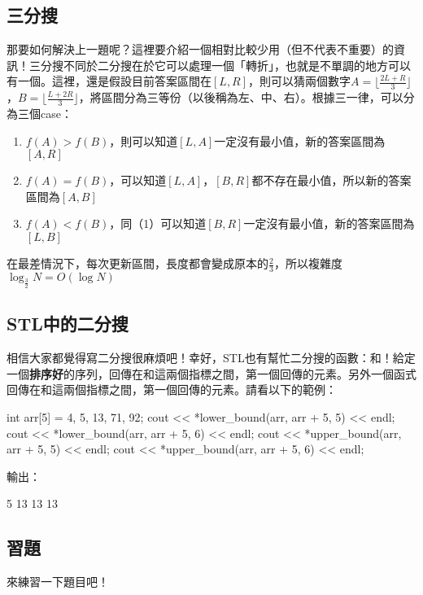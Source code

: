 	\subsection{三分搜}
		那要如何解決上一題呢？這裡要介紹一個相對比較少用（但不代表不重要）的資訊！三分搜不同於二分搜在於它可以處理一個「轉折」，也就是不單調的地方可以有一個。這裡，還是假設目前答案區間在$[L, R]$，則可以猜兩個數字$A = \lfloor \frac{2L + R}{3} \rfloor$，$B = \lfloor \frac{L + 2R}{3} \rfloor$，將區間分為三等份（以後稱為左、中、右）。根據三一律，可以分為三個case：
		\begin{enumerate}
			\item $f(A) > f(B)$，則可以知道$[L, A]$一定沒有最小值，新的答案區間為$[A, R]$
			\item $f(A) = f(B)$，可以知道$[L, A]$，$[B, R]$都不存在最小值，所以新的答案區間為$[A, B]$
			\item $f(A) < f(B)$，同（1）可以知道$[B, R]$一定沒有最小值，新的答案區間為$[L, B]$
		\end{enumerate}
		在最差情況下，每次更新區間，長度都會變成原本的$\frac{2}{3}$，所以複雜度$\log_{\frac{3}{2}}N = O(\log N)$
	\subsection{STL中的二分搜}
		相信大家都覺得寫二分搜很麻煩吧！幸好，STL也有幫忙二分搜的函數：和！給定一個\textbf{排序好}的序列，回傳在和這兩個指標之間，第一個回傳的元素。另外一個函式回傳在和這兩個指標之間，第一個回傳的元素。請看以下的範例：
		\begin{C++}
int arr[5] = {4, 5, 13, 71, 92};
cout << *lower_bound(arr, arr + 5, 5) << endl;
cout << *lower_bound(arr, arr + 5, 6) << endl;
cout << *upper_bound(arr, arr + 5, 5) << endl;
cout << *upper_bound(arr, arr + 5, 6) << endl;
		\end{C++}
	輸出：
	\begin{C++}
5
13
13
13
	\end{C++}
	\subsection{習題}
		來練習一下題目吧！

